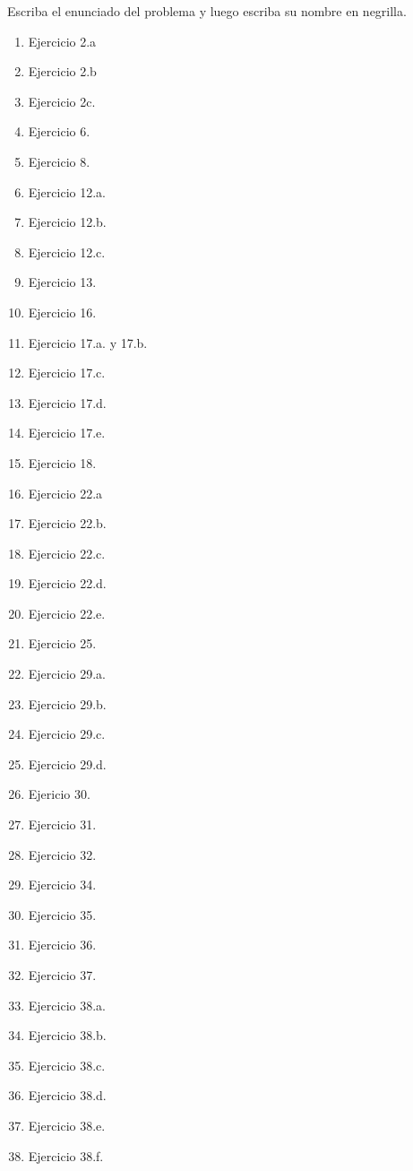 
Escriba el enunciado del problema y luego escriba su nombre en negrilla. 

\begin{enumerate}
    \item Ejercicio 2.a
    \item Ejercicio 2.b
    \item Ejercicio 2c.
    \item Ejercicio 6.
    \item Ejercicio 8.
    \item Ejercicio 12.a.
    \item Ejercicio 12.b.
    \item Ejercicio 12.c.
    \item Ejercicio 13.
    \item Ejercicio 16.
    \item Ejercicio 17.a. y 17.b.
    \item Ejercicio 17.c.
    \item Ejercicio 17.d.
    \item Ejercicio 17.e.
    \item Ejercicio 18.
    \item Ejercicio 22.a 
    \item Ejercicio 22.b.
    \item Ejercicio 22.c.
    \item Ejercicio 22.d.
    \item Ejercicio 22.e.
    \item Ejercicio 25.
    \item Ejercicio 29.a.
    \item Ejercicio 29.b.
    \item Ejercicio 29.c.
    \item Ejercicio 29.d.
    \item Ejericio 30.
    \item Ejercicio 31.
    \item Ejercicio 32.
    \item Ejercicio 34.
    \item Ejercicio 35.
    \item Ejercicio 36.
    \item Ejercicio 37.
    \item Ejercicio 38.a.
    \item Ejercicio 38.b.
    \item Ejercicio 38.c.
    \item Ejercicio 38.d.
    \item Ejercicio 38.e.
    \item Ejercicio 38.f.

\end{enumerate}
